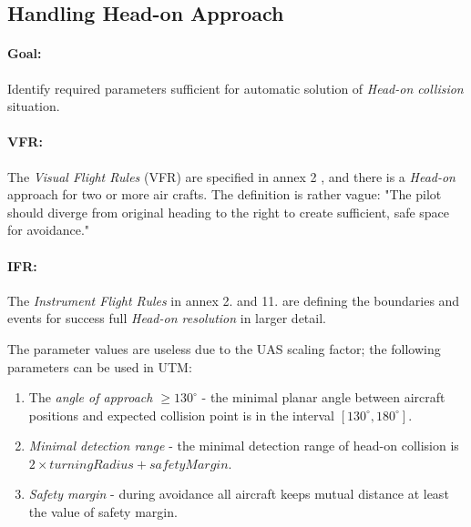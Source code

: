 \subsection{Handling Head-on Approach}\label{sec:handlingHeadOnApproach}

\paragraph{Goal:} Identify required parameters sufficient for automatic solution of \emph{Head-on collision} situation.

\paragraph{VFR:} The \emph{Visual Flight Rules} (VFR) are specified in annex 2 \cite{icaoAnnex2}, and there is a \emph{Head-on} approach for two or more air crafts. The definition is rather vague: "The pilot should diverge from original heading to the right to create sufficient, safe space for avoidance." 

\paragraph{IFR:} The \emph{Instrument Flight Rules} in annex 2. \cite{icaoAnnex2} and 11. \cite{icaoAnnex11} are defining the boundaries and events for success full \emph{Head-on resolution} in larger detail. 

The parameter values are useless due to the UAS scaling factor; the following parameters can be used in UTM:

\begin{enumerate}
    \item The \emph{angle of approach $\ge 130^\circ$} - the minimal planar angle between aircraft positions and expected collision point is in the interval $[130^\circ,180^\circ]$.
    
    \item \emph{Minimal detection range} - the minimal detection range of head-on collision is $2\times turning Radius + safety Margin$.
    
    \item \emph{Safety margin} - during avoidance all aircraft keeps mutual distance at least the value of safety margin.
\end{enumerate}

